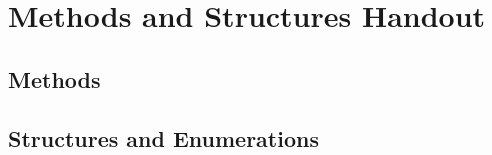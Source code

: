 \chapter{Methods and Structures Handout}
\section{Methods}
\section{Structures and Enumerations}\label{sec:appendix_structs_and_enums}